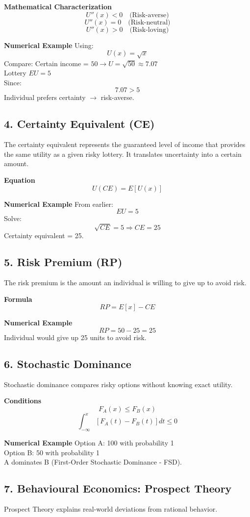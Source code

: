 \documentclass[12pt,a4paper]{article}
\begin{document}
\textbf{Mathematical Characterization}
\[ U''(x) < 0 \quad \text{(Risk-averse)} \]
\[ U''(x) = 0 \quad \text{(Risk-neutral)} \]
\[ U''(x) > 0 \quad \text{(Risk-loving)} \]

\textbf{Numerical Example}
Using:
\[ U(x) = \sqrt{x} \]
Compare:
Certain income = $50 \rightarrow U = \sqrt{50} \approx 7.07$ \\
Lottery $EU = 5$ \\
Since:
\[ 7.07 > 5 \]
Individual prefers certainty $\rightarrow$ risk-averse.

\subsection*{4. Certainty Equivalent (CE)}
The certainty equivalent represents the guaranteed level of income that provides the same utility as a given risky lottery. It translates uncertainty into a certain amount.

\textbf{Equation}
\[ U(CE) = E[U(x)] \]

\textbf{Numerical Example}
From earlier:
\[ EU = 5 \]
Solve:
\[ \sqrt{CE} = 5 \Rightarrow CE = 25 \]
Certainty equivalent = 25.

\subsection*{5. Risk Premium (RP)}
The risk premium is the amount an individual is willing to give up to avoid risk.

\textbf{Formula}
\[ RP = E[x] - CE \]

\textbf{Numerical Example}
\[ RP = 50 - 25 = 25 \]
Individual would give up 25 units to avoid risk.

\subsection*{6. Stochastic Dominance}
Stochastic dominance compares risky options without knowing exact utility.

\textbf{Conditions}
\[ F_A(x) \le F_B(x) \]
\[ \int_{-\infty}^{x} [F_A(t) - F_B(t)] dt \le 0 \]

\textbf{Numerical Example}
Option A: 100 with probability 1 \\
Option B: 50 with probability 1 \\
A dominates B (First-Order Stochastic Dominance - FSD).

\subsection*{7. Behavioural Economics: Prospect Theory}
Prospect Theory explains real-world deviations from rational behavior.
\end{document}
